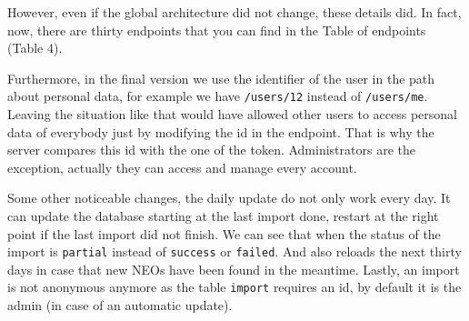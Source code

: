 \medskip

However, even if the global architecture did not change, these details did. In fact, now, there are thirty endpoints that you can find in the Table of endpoints (Table 4).

Furthermore, in the final version we use the identifier of the user in the path about personal data, for example we have \texttt{/users/12} instead of \texttt{/users/me}. Leaving the situation like that would have allowed other users to access personal data of everybody just by modifying the id in the endpoint. That is why the server compares this id with the one of the token. Administrators are the exception, actually they can access and manage every account.

Some other noticeable changes, the daily update do not only work every day. It can update the database starting at the last import done, restart at the right point if the last import did not finish. We can see that when the status of the import is \texttt{partial} instead of \texttt{success} or \texttt{failed}. And also reloads the next thirty days in case that new NEOs have been found in the meantime. Lastly, an import is not anonymous anymore as the table \texttt{import} requires an id, by default it is the admin (in case of an automatic update).

\bigskip
\bigskip
